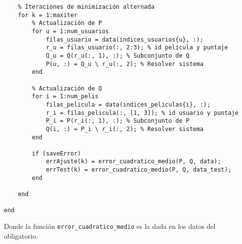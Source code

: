 \documentclass[12pt,a4paper]{article}
\begin{document}
\begin{lstlisting}
    % Iteraciones de minimización alternada
    for k = 1:maxiter
        % Actualización de P
        for u = 1:num_usuarios
            filas_usuario = data(indices_usuarios{u}, :);
            r_u = filas_usuario(:, 2:3); % id película y puntaje
            Q_u = Q(r_u(:, 1), :); % Subconjunto de Q
            P(u, :) = Q_u \ r_u(:, 2); % Resolver sistema
        end

        % Actualización de Q
        for i = 1:num_pelis
            filas_pelicula = data(indices_peliculas{i}, :);
            r_i = filas_pelicula(:, [1, 3]); % id usuario y puntaje
            P_i = P(r_i(:, 1), :); % Subconjunto de P
            Q(i, :) = P_i \ r_i(:, 2); % Resolver sistema
        end

        if (saveError)
            errAjuste(k) = error_cuadratico_medio(P, Q, data);
            errTest(k) = error_cuadratico_medio(P, Q, data_test);
        end

    end

end
\end{lstlisting}
Donde la función \texttt{error\_cuadratico\_medio} es la dada en los datos del obligatorio.
\end{document}
